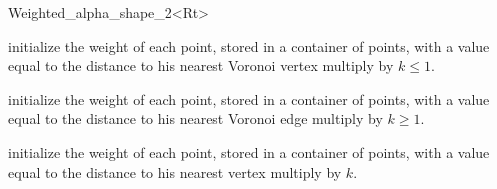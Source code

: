 \begin{ccClassTemplate} {Weighted_alpha_shape_2<Rt>}
\ccOperations

{initialize the weight of each point, stored in a container of points, with a value
equal to the distance to his nearest Voronoi vertex multiply by $k \leq 1$.} 
  
{initialize the weight of each point, stored in a container of points, with a
value equal to the distance to his nearest Voronoi edge multiply by $k \geq 1$.}
  
{initialize the weight of each point, stored in a container of points, with a
value equal to the distance to his nearest vertex multiply by $k$.} 
 
\end{ccClassTemplate}
